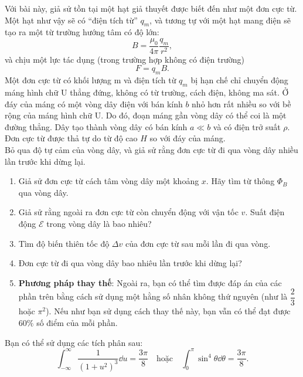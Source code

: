 \begin{vd}%
Với bài này, giả sử tồn tại một hạt giả thuyết được biết đến như một đơn cực từ. Một hạt như vậy sẽ có ``điện tích từ'' $q_m$, và tương tự với một hạt mang điện sẽ tạo ra một từ trường hướng tâm có độ lớn:
$$B=\dfrac{\mu_0}{4\pi}\dfrac{q_m}{r^2},$$
và chịu một lực tác dụng (trong trường hợp không có điện trường)
$$F=q_m B.$$
Một đơn cực từ có khối lượng m và điện tích từ $q_m$ bị hạn chế chỉ chuyển động máng hình chữ U thẳng đứng, không có từ trường, cách điện, không ma sát. Ở đáy của máng có một vòng dây điện với bán kính $b$ nhỏ hơn rất nhiều so với bề rộng của máng hình chữ U. Do đó, đoạn máng gần vòng dây có thể coi là một đường thẳng. Dây tạo thành vòng dây có bán kính $a\ll b$ và có điện trở suất $\rho$. Đơn cực từ được thả tự do từ độ cao $H$ so với đáy của máng.\\
Bỏ qua độ tự cảm của vòng dây, và giả sử rằng đơn cực từ đi qua vòng dây nhiều lần trước khi dừng lại. 
\begin{enumerate}[1)]
    \item Giả sử đơn cực từ cách tâm vòng dây một khoảng $x$. Hãy tìm từ thông $\Phi_B$ qua vòng dây.
    \item Giả sử rằng ngoài ra đơn cực từ còn chuyển động với vận tốc $v$. Suất điện động $\mathcal{E}$ trong vòng dây là bao nhiêu? 
    \item Tìm độ biến thiên tốc độ $\Delta v$ của đơn cực từ sau mỗi lần đi qua vòng.
    \item Đơn cực từ đi qua vòng dây bao nhiêu lần trước khi dừng lại?
    \item \textbf{Phương pháp thay thế}: Ngoài ra, bạn có thể tìm được đáp án của các phần trên bằng cách sử dụng một hằng số nhân không thứ nguyên (như là $\dfrac{2}{3}$ hoặc $\pi ^2$). Nếu như bạn sử dụng cách thay thế này, bạn vẫn có thể đạt được $60\%$ số điểm của mỗi phần.
\end{enumerate}
Bạn có thể sử dụng các tích phân sau:
$$
\int_{-\infty}^{\infty} \dfrac{1}{\left(1+u^{2}\right)^{3}} \dd u=\dfrac{3 \pi}{8}\quad \text{hoặc}\quad 
\int_{0}^{\pi} \sin ^{4} \theta \dd \theta=\dfrac{3 \pi}{8}.
$$
\end{vd}

